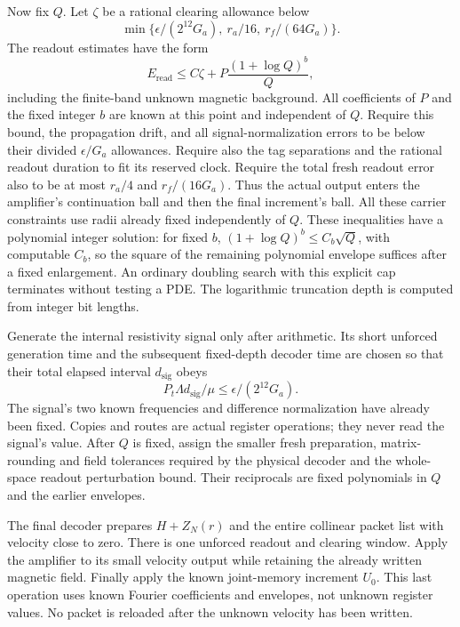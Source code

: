 \documentclass[11pt,a4paper]{amsart}
\theoremstyle{definition}
\theoremstyle{remark}
\numberwithin{equation}{section}
\begin{document}
Now fix $Q$. Let $\zeta$ be a rational clearing allowance below
\[
 \min\{\epsilon/(2^{12}G_a),\ r_a/16,\ r_f/(64G_a)\}.
\]
The readout estimates have the form
\begin{equation}\label{eq:carrier-selection}
 E_{\mathrm{read}}\le C\zeta+
     P\frac{(1+\log Q)^b}{Q},
\end{equation}
including the finite-band unknown magnetic background. All coefficients of
$P$ and the fixed integer $b$ are known at this point and independent of
$Q$. Require this bound, the propagation drift, and all signal-normalization
errors to be below their divided $\epsilon/G_a$ allowances. Require also the
tag separations and the rational readout duration to fit its reserved clock.
Require the total fresh readout error also to be at most $r_a/4$ and
$r_f/(16G_a)$. Thus the actual output enters the amplifier's continuation
ball and then the final increment's ball. All these carrier constraints
use radii already fixed independently of $Q$.
These inequalities have a polynomial integer solution: for fixed $b$,
$(1+\log Q)^b\le C_b\sqrt Q$, with computable $C_b$, so the square of the
remaining polynomial envelope suffices after a fixed enlargement. An
ordinary doubling search with this explicit cap terminates without testing a
PDE. The logarithmic truncation depth is computed from integer bit lengths.

Generate the internal resistivity signal only after arithmetic. Its short
unforced generation time and the subsequent fixed-depth decoder time are
chosen so that their total elapsed interval $d_{\mathrm{sig}}$ obeys
\begin{equation}\label{eq:signal-clock}
 P_t\Lambda d_{\mathrm{sig}}/\mu
          \le\epsilon/(2^{12}G_a).
\end{equation}
The signal's two known frequencies and difference normalization have already
been fixed. Copies and routes are actual register operations; they never
read the signal's value. After $Q$ is fixed, assign the smaller fresh
preparation, matrix-rounding and field tolerances required by the physical
decoder and the whole-space readout perturbation bound. Their reciprocals
are fixed polynomials in $Q$ and the earlier envelopes.

The final decoder prepares $H+Z_N(r)$ and the entire collinear packet list
with velocity close to zero. There is one unforced readout and clearing
window. Apply the amplifier to its small velocity output while retaining the
already written magnetic field. Finally apply the known joint-memory
increment $U_0$. This last operation uses known Fourier coefficients and
envelopes, not unknown register values. No packet is reloaded after the
unknown velocity has been written.
\end{document}
